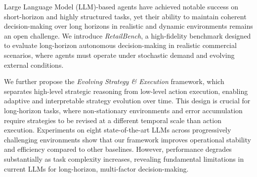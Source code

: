 Large Language Model (LLM)-based agents have achieved notable success on short-horizon and highly structured tasks, yet their ability to maintain coherent decision-making over long horizons in realistic and dynamic environments remains an open challenge. We introduce \textit{RetailBench}, a high-fidelity benchmark designed to evaluate long-horizon autonomous decision-making in realistic commercial scenarios, where agents must operate under stochastic demand and evolving external conditions.

We further propose the \textit{Evolving Strategy \& Execution} framework, which separates high-level strategic reasoning from low-level action execution, enabling adaptive and interpretable strategy evolution over time. This design is crucial for long-horizon tasks, where non-stationary environments and error accumulation require strategies to be revised at a different temporal scale than action execution. Experiments on eight state-of-the-art LLMs across progressively challenging environments show that our framework improves operational stability and efficiency compared to other baselines. However, performance degrades substantially as task complexity increases, revealing fundamental limitations in current LLMs for long-horizon, multi-factor decision-making.
